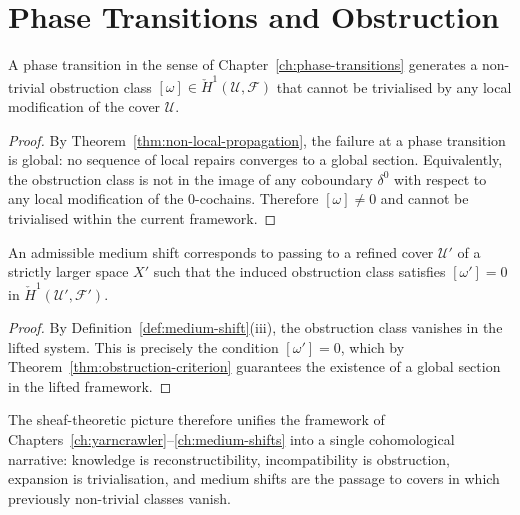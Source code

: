 \documentclass[11pt,openany]{book}
\begin{document}
\section{Phase Transitions and Obstruction}
\label{sec:phase-obstruction}

\begin{proposition}
\label{prop:phase-obstruction}
A phase transition in the sense of
Chapter~\ref{ch:phase-transitions} generates a
non-trivial obstruction class
$[\omega] \in \check{H}^1(\mathcal{U}, \mathcal{F})$ that
cannot be trivialised by any local modification of the
cover $\mathcal{U}$.
\end{proposition}

\begin{proof}
By Theorem~\ref{thm:non-local-propagation}, the failure at
a phase transition is global: no sequence of local repairs
converges to a global section.  Equivalently, the
obstruction class is not in the image of any coboundary
$\delta^0$ with respect to any local modification of the
$0$-cochains.  Therefore $[\omega] \neq 0$ and cannot be
trivialised within the current framework.
\end{proof}

\begin{corollary}
\label{cor:medium-cover}
An admissible medium shift corresponds to passing to a
refined cover $\mathcal{U}'$ of a strictly larger space
$X'$ such that the induced obstruction class satisfies
$[\omega'] = 0$ in $\check{H}^1(\mathcal{U}',
\mathcal{F}')$.
\end{corollary}

\begin{proof}
By Definition~\ref{def:medium-shift}(iii), the obstruction
class vanishes in the lifted system.  This is precisely the
condition $[\omega'] = 0$, which by
Theorem~\ref{thm:obstruction-criterion} guarantees the
existence of a global section in the lifted framework.
\end{proof}

The sheaf-theoretic picture therefore unifies the framework
of Chapters~\ref{ch:yarncrawler}--\ref{ch:medium-shifts}
into a single cohomological narrative: knowledge is
reconstructibility, incompatibility is obstruction,
expansion is trivialisation, and medium shifts are the
passage to covers in which previously non-trivial classes
vanish.

\end{document}
